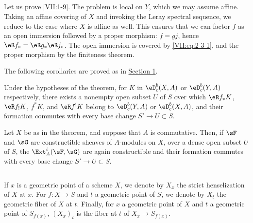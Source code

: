 \documentclass[oneside]{book}
\begin{document}
\subsection{}\label{VII:2-8}

Let us prove \ref{VII:1-9}. The problem is local on $Y$, which we may assume
affine. Taking an affine covering of $X$ and invoking the Leray spectral
sequence, we reduce to the case where $X$ is affine as well. This ensures that
we can factor $f$ as an open immersion followed by a proper morphism:
$f=g j$, hence $\eR f_\ast = \eR g_\ast \eR j_\ast$. The open immersion is
covered by \eqref{VII:eq:2-3-1}, and the proper morphism by the finiteness
theorem.

The following corollaries are proved as in \hyperref[VII:1]{Section 1}.





\begin{corollary_}\label{VII:2-9}
Under the hypotheses of the theorem, for $K$ in $\eD_c^b(X,A)$ or
$\eD_c^b(Y,A)$ respectively, there exists a nonempty open subset $U$ of $S$
over which $\eR f_\ast K$, $\eR f_! K$, $f^\ast K$, and $\eR f^! K$ belong to
$\eD_c^b(Y,A)$ or $\eD_c^b(X,A)$, and their formation commutes with every base
change $S' \to U\subset S$.
\end{corollary_}





\begin{corollary_}\label{VII:2-10}
Let $X$ be as in the theorem, and suppose that $A$ is commutative. Then, if
$\sF$ and $\sG$ are constructible sheaves of $A$-modules on $X$, over a dense
open subset $U$ of $S$, the $\Ext_A^i(\sF,\sG)$ are again constructible and
their formation commutes with every base change $S' \to U\subset S$.
\end{corollary_}





\subsection{}\label{VII:2-11}

If $x$ is a geometric point of a scheme $X$, we denote by $X_x$ the strict
henselization of $X$ at $x$. For $f:X\to S$ and $t$ a geometric point of $S$,
we denote by $X_t$ the geometric fiber of $X$ at $t$. Finally, for $x$ a
geometric point of $X$ and $t$ a geometric point of $S_{f(x)}$, $(X_x)_t$ is
the fiber at $t$ of $X_x \to S_{f(x)}$.
\end{document}
